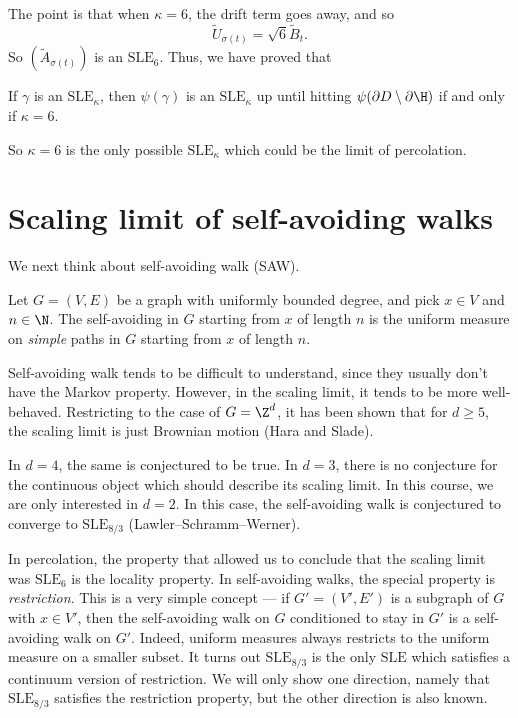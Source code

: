 \documentclass[a4paper]{article}
\newcommand\SLE{\mathrm{SLE}}
\begin{document}
The point is that when $\kappa = 6$, the drift term goes away, and so
\[
  \tilde{U}_{\sigma(t)} = \sqrt{6} \tilde{B}_t.
\]
So $(\tilde{A}_{\sigma(t)})$ is an $\SLE_6$. Thus, we have proved that
\begin{thm}
  If $\gamma$ is an $\SLE_\kappa$, then $\psi(\gamma)$ is an $\SLE_\kappa$ up until hitting $\psi(\partial D \setminus \partial \H)$ if and only if $\kappa = 6$.
\end{thm}

So $\kappa = 6$ is the only possible $\SLE_\kappa$ which could be the limit of percolation.

\section{Scaling limit of self-avoiding walks}\label{sec:saw}
We next think about self-avoiding walk (SAW).

\begin{defi}
  Let $G = (V, E)$ be a graph with uniformly bounded degree, and pick $x \in V$ and $n \in \N$. The self-avoiding in $G$ starting from $x$ of length $n$ is the uniform measure on \emph{simple} paths in $G$ starting from $x$ of length $n$.
\end{defi}
Self-avoiding walk tends to be difficult to understand, since they usually don't have the Markov property. However, in the scaling limit, it tends to be more well-behaved. Restricting to the case of $G = \Z^d$, it has been shown that for $d \geq 5$, the scaling limit is just Brownian motion (Hara and Slade).

In $d = 4$, the same is conjectured to be true. In $d = 3$, there is no conjecture for the continuous object which should describe its scaling limit. In this course, we are only interested in $d = 2$. In this case, the self-avoiding walk is conjectured to converge to $\SLE_{8/3}$ (Lawler--Schramm--Werner).

In percolation, the property that allowed us to conclude that the scaling limit was $\SLE_6$ is the locality property. In self-avoiding walks, the special property is \emph{restriction}. This is a very simple concept --- if $G' = (V', E')$ is a subgraph of $G$ with $x \in V'$, then the self-avoiding walk on $G$ conditioned to stay in $G'$ is a self-avoiding walk on $G'$. Indeed, uniform measures always restricts to the uniform measure on a smaller subset. It turns out $\SLE_{8/3}$ is the only $\SLE$ which satisfies a continuum version of restriction. We will only show one direction, namely that $\SLE_{8/3}$ satisfies the restriction property, but the other direction is also known.
\end{document}
